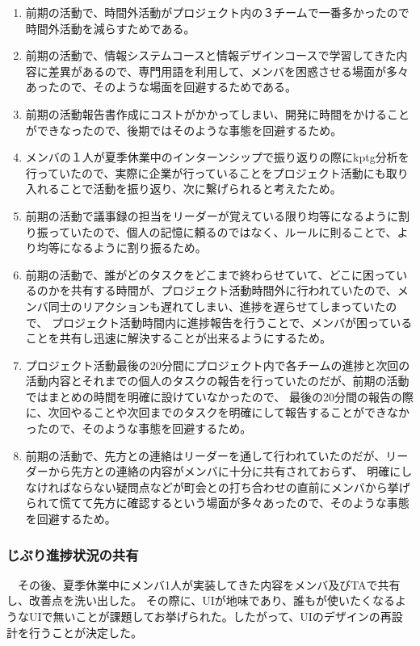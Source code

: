 \begin{enumerate}
    \item 前期の活動で、時間外活動がプロジェクト内の３チームで一番多かったので時間外活動を減らすためである。
    \item 前期の活動で、情報システムコースと情報デザインコースで学習してきた内容に差異があるので、専門用語を利用して、メンバを困惑させる場面が多々あったので、そのような場面を回避するためである。
    \item 前期の活動報告書作成にコストがかかってしまい、開発に時間をかけることができなったので、後期ではそのような事態を回避するため。
    \item メンバの１人が夏季休業中のインターンシップで振り返りの際にkptg分析を行っていたので、実際に企業が行っていることをプロジェクト活動にも取り入れることで活動を振り返り、次に繋げられると考えたため。
    \item 前期の活動で議事録の担当をリーダーが覚えている限り均等になるように割り振っていたので、個人の記憶に頼るのではなく、ルールに則ることで、より均等になるように割り振るため。
    \item 前期の活動で、誰がどのタスクをどこまで終わらせていて、どこに困っているのかを共有する時間が、プロジェクト活動時間外に行われていたので、メンバ同士のリアクションも遅れてしまい、進捗を遅らせてしまっていたので、
          プロジェクト活動時間内に進捗報告を行うことで、メンバが困っていることを共有し迅速に解決することが出来るようにするため。
    \item プロジェクト活動最後の20分間にプロジェクト内で各チームの進捗と次回の活動内容とそれまでの個人のタスクの報告を行っていたのだが、前期の活動ではまとめの時間を明確に設けていなかったので、
          最後の20分間の報告の際に、次回やることや次回までのタスクを明確にして報告することができなかったので、そのような事態を回避するため。
    \item 前期の活動で、先方との連絡はリーダーを通して行われていたのだが、リーダーから先方との連絡の内容がメンバに十分に共有されておらず、
          明確にしなければならない疑問点などが町会との打ち合わせの直前にメンバから挙げられて慌てて先方に確認するという場面が多々あったので、そのような事態を回避するため。
\end{enumerate}

\subsubsection{じぷり進捗状況の共有}
　その後、夏季休業中にメンバ1人が実装してきた内容をメンバ及びTAで共有し、改善点を洗い出した。
その際に、UIが地味であり、誰もが使いたくなるようなUIで無いことが課題してお挙げられた。したがって、UIのデザインの再設計を行うことが決定した。


